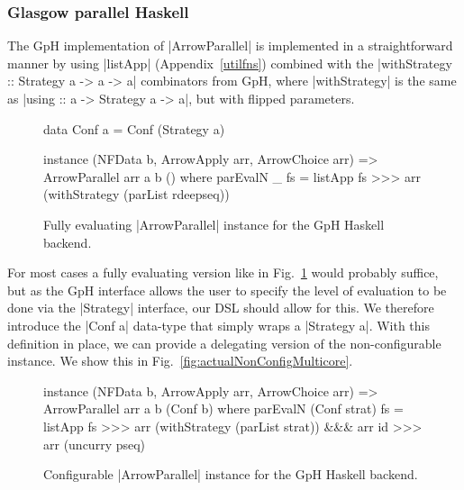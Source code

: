 \subsubsection{Glasgow parallel Haskell} \label{sec:parrows:multicore}
The GpH implementation of |ArrowParallel| is implemented in a straightforward manner by using |listApp| (Appendix~\ref{utilfns}) combined with the |withStrategy :: Strategy a -> a -> a| combinators from GpH, where |withStrategy| is the same as |using :: a -> Strategy a -> a|, but with flipped parameters.
\begin{figure}[t]
\begin{code}
data Conf a = Conf (Strategy a)

instance (NFData b, ArrowApply arr, ArrowChoice arr) => ArrowParallel arr a b () where
    	parEvalN _ fs =
       		listApp fs >>>
        	arr (withStrategy (parList rdeepseq))
\end{code}%
\caption{Fully evaluating |ArrowParallel| instance for the GpH Haskell backend.}
\label{fig:ArrowParallelMulticoreRdeepseq}
\end{figure}
For most cases a fully evaluating version like in Fig.~\ref{fig:ArrowParallelMulticoreRdeepseq} would probably suffice, but as the GpH interface allows the user to specify the level of evaluation to be done via the |Strategy| interface, our DSL should allow for this. We therefore introduce the |Conf a| data-type that simply wraps a |Strategy a|. With this definition in place, we can provide a delegating version of the non-configurable instance. We show this in Fig.~\ref{fig:actualNonConfigMulticore}.
\begin{figure}[t]
\begin{code}
instance (NFData b, ArrowApply arr, ArrowChoice arr) =>
	ArrowParallel arr a b (Conf b) where
    	parEvalN (Conf strat) fs =
        	listApp fs >>>
        	arr (withStrategy (parList strat)) &&& arr id >>>
        	arr (uncurry pseq)
\end{code}
\caption{Configurable |ArrowParallel| instance for the GpH Haskell backend.}
\label{fig:ArrowParallelMulticoreConfigurable}
\end{figure}
